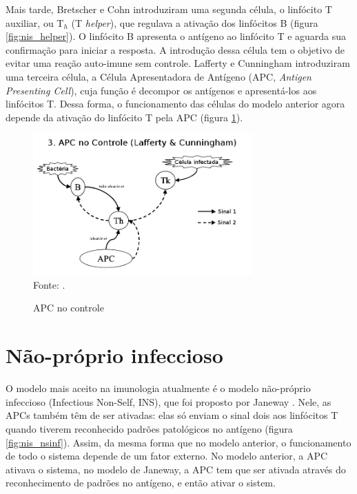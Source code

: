 Mais tarde, Bretscher e Cohn introduziram uma segunda célula, o linfócito T auxiliar, ou T$_{h}$ (T \emph{helper}), que regulava a ativação dos linfócitos B (figura \ref{fig:nis_helper}). O linfócito B apresenta o antígeno ao linfócito T e aguarda sua confirmação para iniciar a resposta. A introdução dessa célula tem o objetivo de evitar uma reação auto-imune sem controle. Lafferty e Cunningham introduziram uma terceira célula, a Célula Apresentadora de Antígeno (APC, \emph{Antigen Presenting Cell}), cuja função é decompor os antígenos e apresentá-los aos linfócitos T. Dessa forma, o funcionamento das células do modelo anterior agora depende da ativação do linfócito T pela APC (figura \ref{fig:nis_apc}).

\begin{figure}[h!]
    \vspace{0.5cm}
    \centering
    \caption{APC no controle}
    \label{fig:nis_apc}
    \vspace{0.5cm}
    \includegraphics[width=0.75\textwidth]{img/signals3-apc_br.png}
    \vspace{0.5cm}
    \\ Fonte: \citet{Aickelin2002}.
    \vspace{0.5cm}
\end{figure}

\section{Não-próprio infeccioso}

O modelo mais aceito na imunologia atualmente é o modelo não-próprio infeccioso (Infectious Non-Self, INS), que foi proposto por Janeway \cite{Janeway1989}. Nele, as APCs também têm de ser ativadas: elas só enviam o sinal dois aos linfócitos T quando tiverem reconhecido padrões patológicos no antígeno (figura \ref{fig:nis_nsinf}). Assim, da mesma forma que no modelo anterior, o funcionamento de todo o sistema depende de um fator externo. No modelo anterior, a APC ativava o sistema, no modelo de Janeway, a APC tem que ser ativada através do reconhecimento de padrões no antígeno, e então ativar o sistem.

